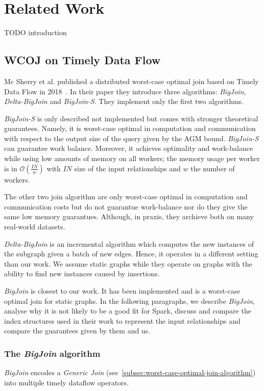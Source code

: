 \section{Related Work} \label{sec:related-work}

TODO introduction
\subsection{\textsc{WCOJ} on Timely Data Flow}\label{subsec:wcoj-timely-data-flow}

Mc Sherry et al. published a distributed worst-case optimal join based on Timely Data Flow in 2018~\cite{ammar2018distributed,naiad}.
In their paper they introduce three algorithms: \textit{BigJoin}, \textit{Delta-BigJoin} and \textit{BigJoin-S}.
They implement only the first two algorithms.

\textit{BigJoin-S} is only described not implemented but comes with stronger theoretical guarantees.
Namely, it is worst-case optimal in computation and communication with respect to the output size of the query
given by the AGM bound.
\textit{BigJoin-S} can guarantee work balance.
Moreover, it achieves optimality and work-balance while using low amounts of memory on all workers;
the memory usage per worker is in $\mathcal{O} (\frac{IN}{w})$ with $IN$ size of the input relationships and $w$ the number of workers.

The other two join algorithm are only worst-case optimal in computation and communication costs but
do not guarantue work-balance nor do they give the same low memory guarantues.
Although, in praxis, they archieve both on many real-world datasets.

\textit{Delta-BigJoin} is an incremental algorithm which computes the new instances of the subgraph given a batch of new edges.
Hence, it operates in a different setting than our work.
We assume static graphs while they operate on graphs with the ability to find new instances caused by insertions.

\textit{BigJoin} is closest to our work.
It has been implemented and is a worst-case optimal join for static graphs.
In the following paragraphs, we describe \textit{BigJoin}, analyse why it is not likely to be a good fit for Spark,
discuss and compare the index structures used in their work to represent the input relationships and compare the
guarantees given by them and us.

\subsubsection{The \textit{BigJoin} algorithm}
\textit{BigJoin} encodes a \textit{Generic Join} (see~\cref{subsec:worst-case-optimal-join-algorithm}) into multiple
timely dataflow operators.

